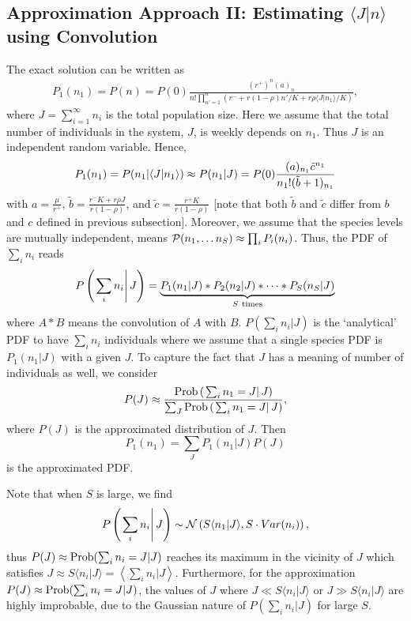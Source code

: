 \documentclass[9pt,twoside,lineno]{pnas-new}
\begin{document}
\subsection*{Approximation Approach II: Estimating $\langle J|n\rangle $ using Convolution }
The exact solution can be written as 
\begin{eqnarray}
    P_1(n_1)=P(n)= P(0)\frac{(r^+)^{n}(a)_{n}}{n!\prod_{n'=1}^{n}\left(r^-+r (1-\rho)n'/K + r\rho \langle J |n_1\rangle /K \right)},
\end{eqnarray}
where $J=\sum_{i=1}^{\infty} n_i $ is the total population size. Here we assume that the total number of individuals in the system, $J$, is weekly depends on $n_1$. Thus $J$ is an independent random variable. Hence, 
\begin{equation} 
    P_1(n_1)=P(n_1|\langle J |n_1 \rangle ) \approx P(n_1|J)=P(0)
    \frac{(a)_{n_1} \Tilde{c}^{n_1}}{n_1 ! (\Tilde{b}+1)_{n_1} } 
\end{equation}
with $a=\frac{\mu}{r^+}$, $\tilde{b}= \frac{r^-K+r\rho J}{r(1-\rho)}$, and $\tilde{c}=\frac{r^+ K}{r(1-\rho)}$ [note that both $\tilde{b}$ and $\tilde{c}$ differ from $b$ and $c$ defined in previous subsection].
Moreover, we assume that the species levels are mutually independent, means ${\cal P}(n_1,\dots n_S) \approx \prod_i P_i(n_i)$. Thus, the PDF of $\sum_i n_i$ reads 
\begin{equation}
    P\left(\left.\sum_i n_i\right|J\right)=\underbrace{P_1(n_1|J)*P_2(n_2|J)* \dots * P_S(n_S|J)}_{S {\rm \ times}}
\end{equation}
where $A*B$ means the convolution of $A$ with $B$. $P\left(\sum_i n_i|J\right)$ is the `analytical' PDF to have $\sum_i n_i$ individuals where we assume that a single species PDF is $P_1(n_1|J)$ with a given $J$. 
To capture the fact that $J$ has a meaning of number of individuals as well, we consider
\begin{equation}
    P(J)\approx \frac{{\rm Prob}\left(\left.\sum_i n_1=J\right|J\right)}{\sum_J {\rm Prob}\left(\left.\sum_i n_1=J\right|J\right)},
\end{equation}
where $P(J)$ is the approximated distribution of $J$. 
Then
\begin{equation}
    P_1(n_1) = \sum_{J}P_1(n_1|J) P(J)
\end{equation}
is the approximated PDF. 

Note that when $S$ is large, we find
\begin{equation}
    P\left(\left.\sum_i n_i\right|J\right) \sim  {\cal N}\left(S\langle n_1 |J \rangle, S \cdot Var(n_i) \right),
\end{equation}
thus $P(J)\approx {\rm Prob}(\sum_i n_i =J|J)$ reaches its maximum in the vicinity of $J$ which satisfies $J\approx S \langle n_i |J \rangle = \left\langle \sum_i n_i |J \right\rangle $. Furthermore, for the approximation $P(J)\approx {\rm Prob}(\sum_i n_i =J|J)$, the values of $J$ where $J\ll S\langle n_i |J \rangle  $ or $J\gg S\langle n_i |J \rangle $ are highly improbable, due to the Gaussian nature of $P(\sum_i n_i|J)$ for large $S$.
 
\end{document}
